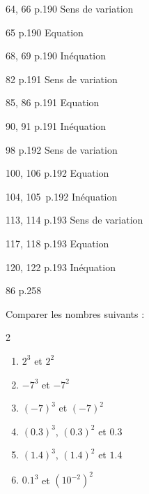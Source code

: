 \documentclass[10pt,a4paper,openany,twoside]{book}
\begin{document}
	\begin{exercices}
		\begin{bookexos}{64, 66 p.190}
			Sens de variation
		\end{bookexos}
		\begin{bookexo}{65 p.190}
			Equation
		\end{bookexo}
		\begin{bookexos}{68, 69 p.190}
			Inéquation
		\end{bookexos}

		\begin{bookexo}{82 p.191}
			Sens de variation
		\end{bookexo}
		\begin{bookexos}{85, 86 p.191}
			Equation
		\end{bookexos}
		\begin{bookexos}{90, 91 p.191}
			Inéquation
		\end{bookexos}

		\begin{bookexo}{98 p.192}
			Sens de variation
		\end{bookexo}
		\begin{bookexos}{100, 106 p.192}
			Equation
		\end{bookexos}
		\begin{bookexos}{104, 105\diff \ p.192}
			Inéquation
		\end{bookexos}

		\begin{bookexos}{113, 114 p.193}
			Sens de variation
		\end{bookexos}
		\begin{bookexos}{117, 118 p.193}
			Equation
		\end{bookexos}
		\begin{bookexos}{120, 122 p.193}
			Inéquation
		\end{bookexos}

		\begin{bookexo}{86 p.258}
		\end{bookexo}

		\begin{exo}
			Comparer les nombres suivants :
			\begin{multicols}{2}
				\begin{enumerate}
					\item $2^3$ et $2^2$
					\item $-7^3$ et $-7^2$
					\item $(-7)^3$ et $(-7)^2$
					\columnbreak
					\item $(0.3)^3$, $(0.3)^2$ et $0.3$
					\item $(1.4)^3$, $(1.4)^2$ et $1.4$
					\item $0.1^3$ et $(10^{-2})^2$
				\end{enumerate}
			\end{multicols}

		\end{exo}

	\end{exercices}

\end{document}
